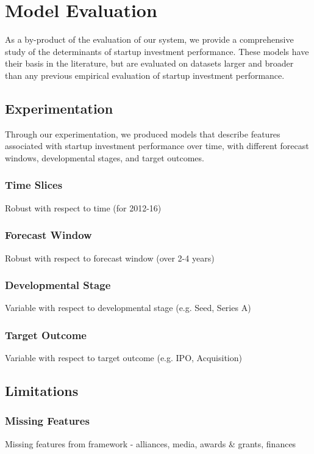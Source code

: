 \documentclass[../thesis/thesis.tex]{subfiles}
\begin{document}
\section{Model Evaluation}

As a by-product of the evaluation of our system, we provide a comprehensive study of the determinants of startup investment performance. These models have their basis in the literature, but are evaluated on datasets larger and broader than any previous empirical evaluation of startup investment performance.

\subsection{Experimentation} %

Through our experimentation, we produced models that describe features associated with startup investment performance over time, with different forecast windows, developmental stages, and target outcomes.

\subsubsection{Time Slices} %
Robust with respect to time (for 2012-16)

\subsubsection{Forecast Window} %
Robust with respect to forecast window (over 2-4 years)

\subsubsection{Developmental Stage} %
Variable with respect to developmental stage (e.g. Seed, Series A)

\subsubsection{Target Outcome} %
Variable with respect to target outcome (e.g. IPO, Acquisition)

\subsection{Limitations} %

\subsubsection{Missing Features} %
Missing features from framework - alliances, media, awards \& grants, finances
\end{document}
